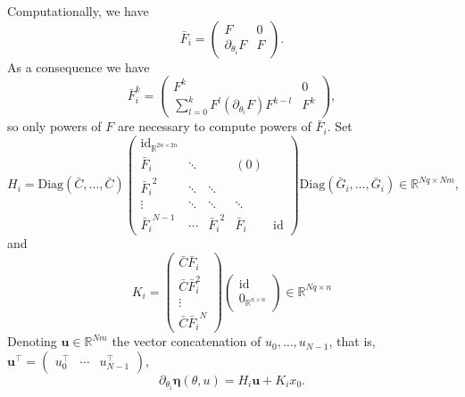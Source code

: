 \documentclass[a4paper]{article}
\theoremstyle{definition}
\theoremstyle{remark}
\newcommand{\R}{\mathbb{R}}
\newcommand{\id}{\mathrm{id}}
\newcommand{\ub}{\mathbf{u}}
\newcommand{\etab}{\boldsymbol{\eta}}
\begin{document}
Computationally, we have
\begin{equation}
    \bar{F}_i=
    \begin{pmatrix}
    F & 0
    \\
    \partial_{\theta_i} F &  F
    \end{pmatrix}.
\end{equation}
As a consequence we have
\begin{equation}
\bar F_i^k
=
\begin{pmatrix}
    F^k & 0
    \\
    \sum_{l=0}^k F^l (\partial_{\theta_i} F) F^{k-l} &  F^k
    \end{pmatrix},
\end{equation}
so only powers of $F$ are necessary to compute powers of $\bar F_i$.
Set 
\begin{equation}
H_i
=
    \mathrm{Diag}(\bar C,\dots, \bar C)
    \begin{pmatrix}
    \id_{\R^{2n\times 2n}} &  &  &
    \\
    \bar F_i & \ddots &  &(0)
    \\
    {\bar F_i}^2  &\ddots  &\ddots& &
    \\
    \vdots &\ddots  &\ddots&\ddots &
    \\
    {\bar F_i}^{N-1}&\cdots&{\bar F_i}^2&{\bar F_i}&\id
    \end{pmatrix}
    \mathrm{Diag}(\bar G_i,\dots, \bar G_i) \in \R^{Nq\times N m},
\end{equation}
and
\begin{equation}
    K_i
=
    \begin{pmatrix}
    \bar C \bar F_i 
    \\
    \bar C \bar F_i^2
    \\
    \vdots 
    \\
   \bar C{\bar F_i}^{N}
    \end{pmatrix}
    \begin{pmatrix}
    \id
    \\
    0_{\R^{n\times n}}
    \end{pmatrix}
    \in \R^{Nq\times n}
\end{equation}
Denoting $\ub\in \R^{Nm}$ the vector concatenation of $u_0,\dots ,u_{N-1}$, that is, $\ub^\top=\begin{pmatrix}
u_0^\top & \cdots & u_{N-1}^\top
\end{pmatrix}$,
\begin{equation}
\partial_{\theta_i}\etab(\theta,u)=H_i \ub + K_i x_0.
\end{equation}
\end{document}
